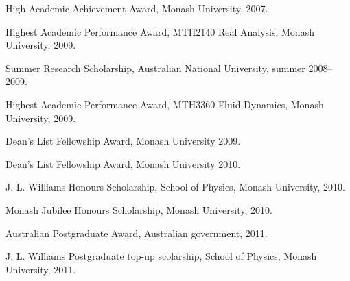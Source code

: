 \documentclass[10pt,letterpaper]{article}
\renewenvironment{itemize}{
  \begin{list}{}{
    \setlength{\leftmargin}{1.5em}
    \setlength{\itemsep}{0.25em}
    \setlength{\parskip}{0pt}
    \setlength{\parsep}{0.25em}
  }
}{
  \end{list}
}
\begin{document}
\begin{itemize}
\item High Academic Achievement Award, Monash University, 2007.
\item Highest Academic Performance Award, MTH2140 Real Analysis, Monash University, 2009.
\item Summer Research Scholarship, Australian National University, summer 2008--2009.
\item Highest Academic Performance Award, MTH3360 Fluid Dynamics, Monash University, 2009.
\item Dean's List Fellowship Award, Monash University 2009.
\item Dean's List Fellowship Award, Monash University 2010.
\item J. L. Williams Honours Scholarship, School of Physics, Monash University, 2010.
\item Monash Jubilee Honours Scholarship, Monash University, 2010.
\item Australian Postgraduate Award, Australian government, 2011.
\item J. L. Williams Postgraduate top-up scolarship, School of Physics, Monash University, 2011.
\end{itemize}
\end{document}

